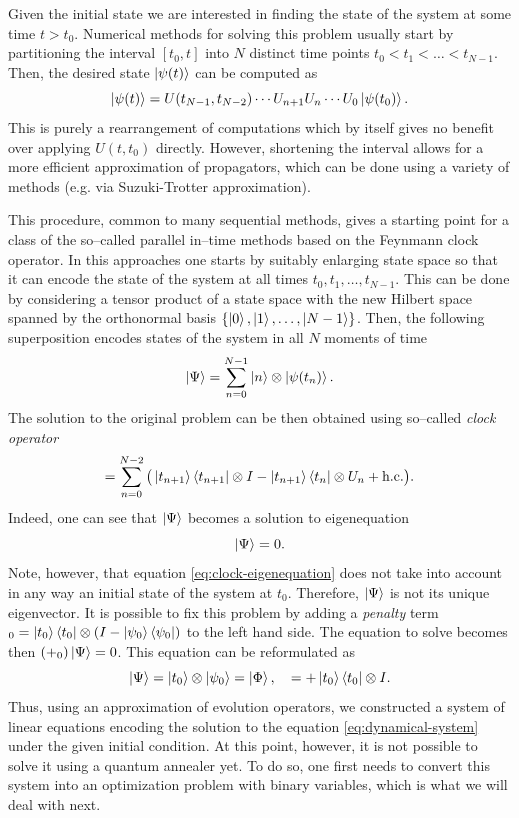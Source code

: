 Given the initial state we are interested in finding the state of the
system at some time $t > t_0$. Numerical methods for solving this problem
usually start by partitioning the interval $[t_0, t]$ into $N$ distinct time
points $t_0 < t_1 < \ldots < t_{N-1}$. Then, the desired state $\ket{\psi(t)}$
can be computed as
\begin{equation}
\ket{\psi(t)} = U(t_{N-1}, t_{N-2}) \cdots U_{n+1}U_n \cdots U_0 \ket{\psi(t_0)}.
\end{equation}
This is purely a rearrangement of computations which by itself gives no benefit
over applying $U(t, t_0)$ directly. However, shortening the interval allows for a more efficient approximation of propagators, which can be done using a variety of methods (e.g. via Suzuki-Trotter approximation).

This procedure, common to many sequential methods, gives a starting point for a class of the so--called parallel in--time methods based on the Feynmann clock operator. In this approaches one starts by suitably enlarging state space so that it can encode the state of the system at all times $t_0, t_1, \ldots, t_{N-1}$. This can be done by considering a tensor product of a state space with the new Hilbert space spanned by the orthonormal basis $\{\ket{0}, \ket{1}, \ldots, \ket{N-1}\}$. Then, the following superposition encodes states of the system in all $N$ moments of time
\begin{equation}
    \ket{\Psi} = \sum_{n=0}^{N-1} \ket{n} \otimes \ket{\psi(t_n)}.
\end{equation}
The solution to the original problem can be then obtained using so--called \emph{clock operator}
\begin{equation}
\label{eq:clock2}
 \clockop
   =
\sum_{n=0}^{N-2}
\big(
\ket{t_{n+1}}\bra{t_{n+1}} \otimes I - \ket{t_{n+1}}\bra{t_n} \otimes U_n
+ \text{h.c.}
\big).
\end{equation}
Indeed, one can see that $\ket{\Psi}$ becomes a solution to eigenequation
\begin{equation}
\label{eq:clock-eigenequation}
\clockop \ket{\Psi} = 0.
\end{equation}
Note, however, that equation \eqref{eq:clock-eigenequation} does not take into account in any way an initial state of the system at $t_0$. Therefore, $\ket{\Psi}$ is not its unique eigenvector. It is possible to fix this problem by adding a \emph{penalty} term $\clockop_0 = \ket{t_0}\bra{t_0}\otimes(I-\ket{\psi_0}\bra{\psi_0})$ to the left hand side. The equation to solve becomes then $(\clockop + \clockop_0) \ket{\Psi} = 0$.
This equation can be reformulated as
\begin{equation}
\label{eq:gsys}
\coefmatrix \ket{\Psi}
=
\ket{t_0}\otimes \ket{\psi_0} = \ket{\Phi},
\quad
\coefmatrix=\clockop + \ket{t_0}\bra{t_0} \otimes I.
\end{equation}
Thus, using an approximation of evolution operators, we constructed a system of linear equations encoding the solution to the equation \eqref{eq:dynamical-system} under the given initial condition. At this point, however, it is not possible to solve it using a quantum annealer yet. To do so, one first needs to convert this system into an optimization problem
with binary variables, which is what we will deal with next.
